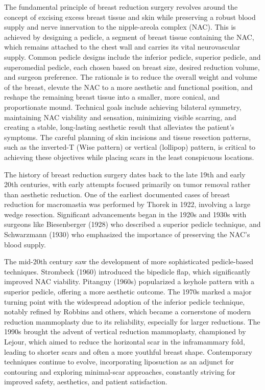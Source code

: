 The fundamental principle of breast reduction surgery revolves around the concept of excising excess breast tissue and skin while preserving a robust blood supply and nerve innervation to the nipple-areola complex (NAC). This is achieved by designing a pedicle, a segment of breast tissue containing the NAC, which remains attached to the chest wall and carries its vital neurovascular supply. Common pedicle designs include the inferior pedicle, superior pedicle, and superomedial pedicle, each chosen based on breast size, desired reduction volume, and surgeon preference. The rationale is to reduce the overall weight and volume of the breast, elevate the NAC to a more aesthetic and functional position, and reshape the remaining breast tissue into a smaller, more conical, and proportionate mound. Technical goals include achieving bilateral symmetry, maintaining NAC viability and sensation, minimizing visible scarring, and creating a stable, long-lasting aesthetic result that alleviates the patient's symptoms. The careful planning of skin incisions and tissue resection patterns, such as the inverted-T (Wise pattern) or vertical (lollipop) pattern, is critical to achieving these objectives while placing scars in the least conspicuous locations.

The history of breast reduction surgery dates back to the late 19th and early 20th centuries, with early attempts focused primarily on tumor removal rather than aesthetic reduction. One of the earliest documented cases of breast reduction for macromastia was performed by Thorek in 1922, involving a large wedge resection. Significant advancements began in the 1920s and 1930s with surgeons like Biesenberger (1928) who described a superior pedicle technique, and Schwarzmann (1930) who emphasized the importance of preserving the NAC's blood supply.

The mid-20th century saw the development of more sophisticated pedicle-based techniques. Strombeck (1960) introduced the bipedicle flap, which significantly improved NAC viability. Pitanguy (1960s) popularized a keyhole pattern with a superior pedicle, offering a more aesthetic outcome. The 1970s marked a major turning point with the widespread adoption of the inferior pedicle technique, notably refined by Robbins and others, which became a cornerstone of modern reduction mammoplasty due to its reliability, especially for larger reductions. The 1990s brought the advent of vertical reduction mammoplasty, championed by Lejour, which aimed to reduce the horizontal scar in the inframammary fold, leading to shorter scars and often a more youthful breast shape. Contemporary techniques continue to evolve, incorporating liposuction as an adjunct for contouring and exploring minimal-scar approaches, constantly striving for improved safety, aesthetics, and patient satisfaction.

